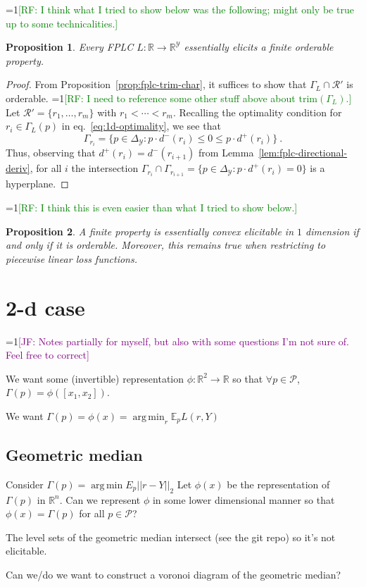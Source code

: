 \documentclass[11pt]{article}
\newcommand{\Comments}{1}
\newcommand{\mynote}[2]{\ifnum\Comments=1\textcolor{#1}{#2}\fi}
\newcommand{\raf}[1]{\mynote{green}{[RF: #1]}}
\newcommand{\jessie}[1]{\mynote{purple}{[JF: #1]}}
\newcommand{\reals}{\mathbb{R}}
\newcommand{\E}{\mathbb{E}}
\renewcommand{\P}{\mathcal{P}}
\newcommand{\R}{\mathcal{R}}
\newcommand{\Y}{\mathcal{Y}}
\renewcommand{\P}{\mathcal{P}}
\newcommand{\trim}{\mathrm{trim}}
\DeclareMathOperator*{\argmin}{arg\,min}
\newtheorem{proposition}{Proposition}
\begin{document}
\raf{I think what I tried to show below was the following; might only be true up to some technicalities.}
\begin{proposition}
  Every FPLC $L : \reals \to \reals^\Y$ essentially elicits a finite orderable property.
\end{proposition}
\begin{proof}
  From Proposition~\ref{prop:fplc-trim-char}, it suffices to show that $\Gamma_L\cap\R'$ is orderable.
  \raf{I need to reference some other stuff above about $\trim(\Gamma_L)$.}
  Let $\R' = \{r_1,\ldots,r_m\}$ with $r_1 < \cdots < r_m$.
  Recalling the optimality condition for $r_i \in \Gamma_L(p)$ in eq.~\eqref{eq:1d-optimality}, we see that
  \begin{equation*}\label{eq:fplc-level-set}
    \Gamma_{r_i} = \{ p \in \Delta_\Y : p\cdot d^-(r_i) \leq 0 \leq p\cdot d^+(r_{i}) \}~.
  \end{equation*}
  Thus, observing that $d^+(r_i) = d^-(r_{i+1})$ from Lemma~\ref{lem:fplc-directional-deriv}, for all $i$ the intersection $\Gamma_{r_i} \cap \Gamma_{r_{i+1}} = \{ p \in \Delta_\Y : p\cdot d^+(r_i) = 0\}$ is a hyperplane.
\end{proof}


\raf{I think this is even easier than what I tried to show below.}
\begin{proposition}
  A finite property is essentially convex elicitable in $1$ dimension if and only if it is orderable.
  Moreover, this remains true when restricting to piecewise linear loss functions.
\end{proposition}



\section{2-d case}
\jessie{Notes partially for myself, but also with some questions I'm not sure of.  Feel free to correct}

We want some (invertible) representation $\phi: \reals^2 \to \reals$ so that $\forall p \in \P$, $\Gamma(p) = \phi([ x_1, x_2 ])$.

We want $\Gamma(p) = \phi(x) = \argmin_r \E_p L(r, Y)$

\subsection{Geometric median}
Consider $\Gamma(p) = \argmin E_p ||r - Y ||_2$
Let $\phi(x)$ be the representation of $\Gamma(p)$ in $\reals^n$.
Can we represent $\phi$ in some lower dimensional manner so that $\phi(x) = \Gamma(p)$ for all $p \in \P$?

The level sets of the geometric median intersect (see the git repo) so it's not elicitable.

Can we/do we want to construct a voronoi diagram of the geometric median?
\end{document}
